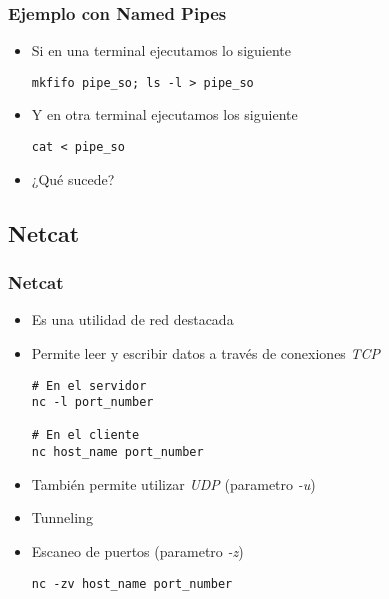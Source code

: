\begin{frame}[fragile]
  \frametitle{Ejemplo con Named Pipes}
  \begin{itemize}
   \item Si en una terminal ejecutamos lo siguiente
   \begin{lstlisting}
mkfifo pipe_so; ls -l > pipe_so
   \end{lstlisting}
   \item Y en otra terminal ejecutamos los siguiente
   \begin{lstlisting}
cat < pipe_so
   \end{lstlisting}
   \item ¿Qué sucede?
  \end{itemize}
\end{frame}

\subsection{Netcat}
\begin{frame}[fragile]
  \frametitle{Netcat}
  \begin{itemize}
    \item Es una utilidad de red destacada
    \item Permite leer y escribir datos a través de conexiones \textit{TCP}
      \begin{lstlisting}
# En el servidor
nc -l port_number

# En el cliente
nc host_name port_number
      \end{lstlisting}
    \item También permite utilizar \textit{UDP} (parametro \textit{-u})
    \item Tunneling
    \item Escaneo de puertos (parametro \textit{-z})
      \begin{lstlisting}	
nc -zv host_name port_number
      \end{lstlisting}
  \end{itemize}
\end{frame}

